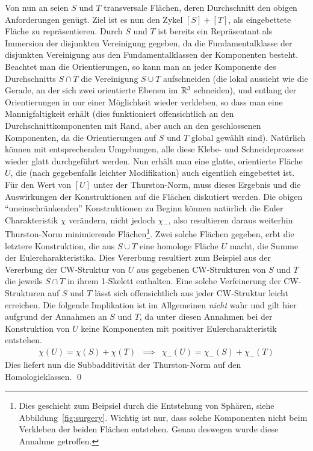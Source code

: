             Von nun an seien $S$ und $T$ transversale Flächen, deren Durchschnitt den obigen Anforderungen genügt. Ziel ist es nun den Zykel $[S]+[T]$, als eingebettete Fläche zu repräsentieren. Durch $S$ und $T$ ist bereits ein Repräsentant als Immersion der disjunkten Vereinigung gegeben, da die Fundamentalklasse der disjunkten Vereinigung aus den Fundamentalklassen der Komponenten besteht. Beachtet man die Orientierungen, so kann man an jeder Komponente des Durchschnitts $S\cap T$ die Vereinigung $S\cup T$ aufschneiden (die lokal aussieht wie die Gerade, an der sich zwei orientierte Ebenen im $\mathbb{R}^3$ schneiden), und entlang der Orientierungen in nur einer Möglichkeit wieder verkleben, so dass man eine Mannigfaltigkeit erhält (dies funktioniert offensichtlich an den Durchschnittkomponenten mit Rand, aber auch an den geschlossenen Komponenten, da die Orientierungen auf $S$ und $T$ global gewählt sind). Natürlich können mit entsprechenden Umgebungen, alle diese Klebe- und Schneideprozesse wieder glatt durchgeführt werden. Nun erhält man eine glatte, orientierte Fläche $U$, die (nach gegebenfalls leichter Modifikation) auch eigentlich eingebettet ist. Für den Wert von $[U]$ unter der Thurston-Norm, muss dieses Ergebnis und die Auswirkungen der Konstruktionen auf die Flächen diskutiert werden. Die obigen "`uneinschränkenden"' Konstruktionen zu Beginn können natürlich die Euler Charakteristik $\chi$ verändern, nicht jedoch $\chi_-$, also resultieren daraus weiterhin Thurston-Norm minimierende Flächen\footnote{Dies geschieht zum Beipsiel durch die Entstehung von Sphären, siehe Abbildung~\ref{fig:surgery}. Wichtig ist nur, dass solche Komponenten nicht beim Verkleben der beiden Flächen entstehen. Genau deswegen wurde diese Annahme getroffen.}. Zwei {solche} Flächen gegeben, erbt die letztere Konstruktion, die aus $S\cup T$ eine homologe Fläche $U$ macht, die Summe der Eulercharakteristika. Dies Vererbung resultiert zum Beispiel aus der Vererbung der CW-Struktur von $U$ aus gegebenen CW-Strukturen von $S$ und $T$ die jeweils $S\cap T$ in ihrem 1-Skelett enthalten. Eine solche Verfeinerung der CW-Strukturen auf $S$ und $T$ lässt sich offensichtlich aus jeder CW-Struktur leicht erreichen. Die folgende Implikation ist im Allgemeinen \emph{nicht} wahr und gilt hier aufgrund der Annahmen an $S$ und $T$, da unter diesen Annahmen bei der Konstruktion von $U$ keine Komponenten mit positiver Eulercharakteristik entstehen.
            \begin{eqnarray*}
                \chi(U) = \chi(S) + \chi(T) &\implies& \chi_-(U)=\chi_-(S) + \chi_-(T)
            \end{eqnarray*}
            Dies liefert nun die Subbadditivität der Thurston-Norm auf den Homologieklassen.
        \qed
        \vspace{6pt}

